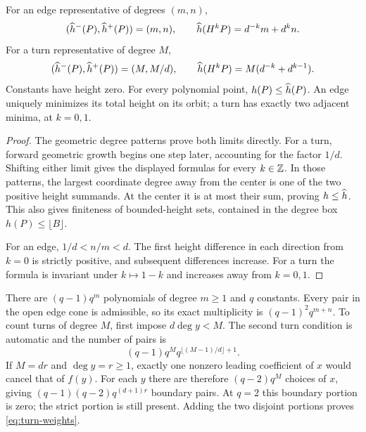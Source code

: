 \begin{lemma}\label{lem:heights}
For an edge representative of degrees $(m,n)$,
\begin{equation}\label{eq:edge-height}
 (\widehat h^-(P),\widehat h^+(P))=(m,n),\qquad
 \widehat h(H^kP)=d^{-k}m+d^kn.
\end{equation}
For a turn representative of degree $M$,
\begin{equation}\label{eq:turn-height}
 (\widehat h^-(P),\widehat h^+(P))=(M,M/d),\qquad
 \widehat h(H^kP)=M(d^{-k}+d^{k-1}).
\end{equation}
Constants have height zero. For every polynomial point,
$h(P)\le\widehat h(P)$. An edge uniquely minimizes its total height
on its orbit; a turn has exactly two adjacent minima, at $k=0,1$.
\end{lemma}
\begin{proof}
The geometric degree patterns prove both limits directly.
For a turn, forward geometric growth begins one step later,
accounting for the factor $1/d$. Shifting either limit gives
the displayed formulas for every $k\in\mathbb Z$. In those patterns,
the largest coordinate degree away from the center is one of
the two positive height summands. At the center it is at most
their sum, proving $h\le\widehat h$. This also gives finiteness of
bounded-height sets, contained in the degree box
$h(P)\le\lfloor B\rfloor$.

For an edge, $1/d<n/m<d$. The first height difference in
each direction from $k=0$ is strictly positive, and subsequent
differences increase. For a turn the formula is invariant
under $k\mapsto1-k$ and increases away from $k=0,1$.
\end{proof}

There are $(q-1)q^m$ polynomials of degree $m\ge1$ and $q$
constants. Every pair in the open edge cone is admissible, so
its exact multiplicity is $(q-1)^2q^{m+n}$. To count turns
of degree $M$, first impose $d\deg y<M$. The second turn
condition is automatic and the number of pairs is
\begin{equation}\label{eq:strict-turn-count}
 (q-1)q^M q^{\lfloor(M-1)/d\rfloor+1}.
\end{equation}
If $M=dr$ and $\deg y=r\ge1$, exactly one nonzero leading
coefficient of $x$ would cancel that of $f(y)$. For each $y$
there are therefore $(q-2)q^M$ choices of $x$, giving
$(q-1)(q-2)q^{(d+1)r}$ boundary pairs. At $q=2$ this
boundary portion is zero; the strict portion is still present.
Adding the two disjoint portions proves \eqref{eq:turn-weights}.

